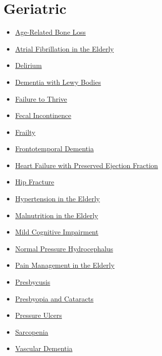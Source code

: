 \section*{Geriatric}
\label{sec:organ_geriatric}
\begin{itemize}[noitemsep]
  \item \hyperlink{sec:Age-Related Bone Loss}{Age-Related Bone Loss}
  \item \hyperlink{sec:Atrial Fibrillation in the Elderly}{Atrial Fibrillation in the Elderly}
  \item \hyperlink{sec:Delirium}{Delirium}
  \item \hyperlink{sec:Dementia with Lewy Bodies}{Dementia with Lewy Bodies}
  \item \hyperlink{sec:Failure to Thrive}{Failure to Thrive}
  \item \hyperlink{sec:Fecal Incontinence}{Fecal Incontinence}
  \item \hyperlink{sec:Frailty}{Frailty}
  \item \hyperlink{sec:geriatric:Frontotemporal Dementia}{Frontotemporal Dementia}
  \item \hyperlink{sec:geriatric:Heart Failure with Preserved Ejection Fraction}{Heart Failure with Preserved Ejection Fraction}
  \item \hyperlink{sec:Hip Fracture}{Hip Fracture}
  \item \hyperlink{sec:Hypertension in the Elderly}{Hypertension in the Elderly}
  \item \hyperlink{sec:Malnutrition in the Elderly}{Malnutrition in the Elderly}
  \item \hyperlink{sec:Mild Cognitive Impairment}{Mild Cognitive Impairment}
  \item \hyperlink{sec:Normal Pressure Hydrocephalus}{Normal Pressure Hydrocephalus}
  \item \hyperlink{sec:Pain Management in the Elderly}{Pain Management in the Elderly}
  \item \hyperlink{sec:Presbycusis}{Presbycusis}
  \item \hyperlink{sec:Presbyopia and Cataracts}{Presbyopia and Cataracts}
  \item \hyperlink{sec:Pressure Ulcers}{Pressure Ulcers}
  \item \hyperlink{sec:Sarcopenia}{Sarcopenia}
  \item \hyperlink{sec:Vascular Dementia}{Vascular Dementia}
\end{itemize}

